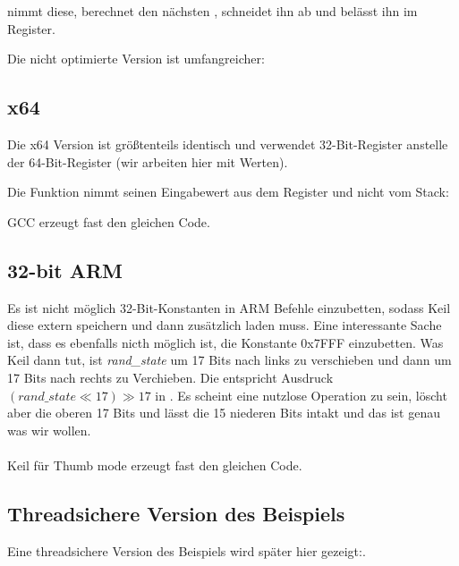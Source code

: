  nimmt diese, berechnet den nächsten , schneidet ihn ab und belässt ihn im \EAX Register.

Die nicht optimierte Version ist umfangreicher:



\subsection{x64}
Die x64 Version ist größtenteils identisch und verwendet 32-Bit-Register anstelle der 64-Bit-Register (wir arbeiten
hier mit \Tint Werten).

Die Funktion  nimmt seinen Eingabewert aus dem Register \ECX und nicht vom Stack:



GCC erzeugt fast den gleichen Code.

\subsection{32-bit ARM}


Es ist nicht möglich 32-Bit-Konstanten in ARM Befehle einzubetten, sodass Keil diese extern speichern und dann
zusätzlich laden muss. Eine interessante Sache ist, dass es ebenfalls nicth möglich ist, die Konstante 0x7FFF
einzubetten.
Was Keil dann tut, ist \emph{rand\_state} um 17 Bits nach links zu verschieben und dann um 17 Bits nach rechts zu
Verchieben.
Die entspricht Ausdruck $(rand\_state \ll 17) \gg 17$ in \CCpp.
Es scheint eine nutzlose Operation zu sein, löscht aber die oberen 17 Bits und lässt die 15 niederen Bits intakt und das
ist genau was wir wollen.\\\\

\Optimizing Keil für Thumb mode erzeugt fast den gleichen Code.



\subsection{Threadsichere Version des Beispiels}
Eine threadsichere Version des Beispiels wird später hier gezeigt:. 
